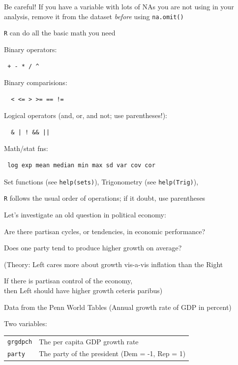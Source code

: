 \documentclass[pdflatex,landscape,titlepage]{foils}
\begin{document}
Be careful!  If you have a variable with lots of NAs you are not using in your analysis, remove it from the dataset \emph{before} using \texttt{na.omit()}


\texttt{R} can do all the basic math you need

Binary operators:  \begin{verbatim} + - * / ^ \end{verbatim}

Binary comparisions:  \begin{verbatim}  < <= > >= == != \end{verbatim}

Logical operators (and, or, and not; use
parentheses!):  \begin{verbatim}  & | ! && || \end{verbatim}

Math/stat fns:  \begin{verbatim} log exp mean median min max sd var cov cor \end{verbatim}

Set functions (see \texttt{help(sets)}), Trigonometry (see \texttt{help(Trig)}), 

\texttt{R} follows the usual order of operations; if it doubt, use parentheses



Let's investigate an old question in political economy:

Are there partisan cycles, or tendencies, in economic performance?

Does one party tend to produce higher growth on average?

(Theory:  Left cares more about growth vis-a-vis inflation than the Right

If there is partisan control of the economy, \\
then Left should have higher growth ceteris paribus)

Data from the Penn World Tables (Annual growth rate of GDP in percent)

Two variables:

\begin{tabular}{ll}
\texttt{grgdpch}   &The per capita GDP growth rate \\
\texttt{party}     &The party of the president (Dem =  -1, Rep = 1) \\
\end{tabular}
\end{document}
